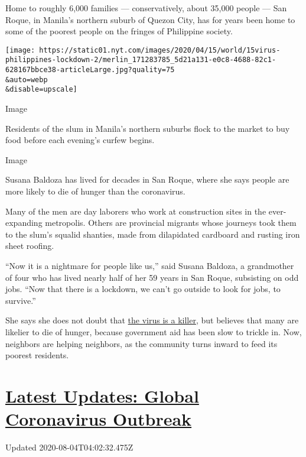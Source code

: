 Home to roughly 6,000 families --- conservatively, about 35,000 people
--- San Roque, in Manila's northern suburb of Quezon City, has for years
been home to some of the poorest people on the fringes of Philippine
society.

\texttt{[image: https://static01.nyt.com/images/2020/04/15/world/15virus-philippines-lockdown-2/merlin\_171283785\_5d21a131-e0c8-4688-82c1-628167bbce38-articleLarge.jpg?quality=75\\\&auto=webp\\\&disable=upscale]}

Image

Residents of the slum in Manila's northern suburbs flock to the market
to buy food before each evening's curfew begins.

Image

Susana Baldoza has lived for decades in San Roque, where she says people
are more likely to die of hunger than the coronavirus.

Many of the men are day laborers who work at construction sites in the
ever-expanding metropolis. Others are provincial migrants whose journeys
took them to the slum's squalid shanties, made from dilapidated
cardboard and rusting iron sheet roofing.

``Now it is a nightmare for people like us,'' said Susana Baldoza, a
grandmother of four who has lived nearly half of her 59 years in San
Roque, subsisting on odd jobs. ``Now that there is a lockdown, we can't
go outside to look for jobs, to survive.''

She says she does not doubt that
\href{https://www.nytimes.com/2020/02/02/world/asia/philippines-coronavirus-china.html}{the
virus is a killer}, but believes that many are likelier to die of
hunger, because government aid has been slow to trickle in. Now,
neighbors are helping neighbors, as the community turns inward to feed
its poorest residents.

\hypertarget{latest-updates-global-coronavirus-outbreak}{%
\section{\texorpdfstring{\href{https://www.nytimes.com/2020/08/03/world/coronavirus-covid-19.html?action=click\&pgtype=Article\&state=default\&region=MAIN_CONTENT_1\&context=storylines_live_updates}{Latest
Updates: Global Coronavirus
Outbreak}}{Latest Updates: Global Coronavirus Outbreak}}\label{latest-updates-global-coronavirus-outbreak}}

Updated 2020-08-04T04:02:32.475Z

